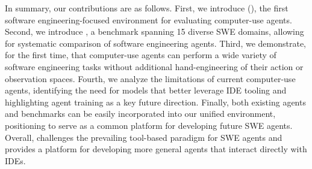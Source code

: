 In summary, our contributions are as follows.
First, we introduce \Ours{} (\ours{}), the first software engineering-focused environment for evaluating computer-use agents.
Second, we introduce \bench{}, a benchmark spanning 15 diverse SWE domains, allowing for systematic comparison of software engineering agents.
Third, we demonstrate, for the first time, that computer-use agents can perform a wide variety of software engineering tasks without additional hand-engineering of their action or observation spaces.
Fourth, we analyze the limitations of current computer-use agents, identifying the need for models that better leverage IDE tooling and highlighting agent training as a key future direction.
Finally, both existing agents and benchmarks can be easily incorporated into our unified environment, positioning \ours{} to serve as a common platform for developing future SWE agents.
Overall, \ours{} challenges the prevailing tool-based paradigm for SWE agents and provides a platform for developing more general agents that interact directly with IDEs.

